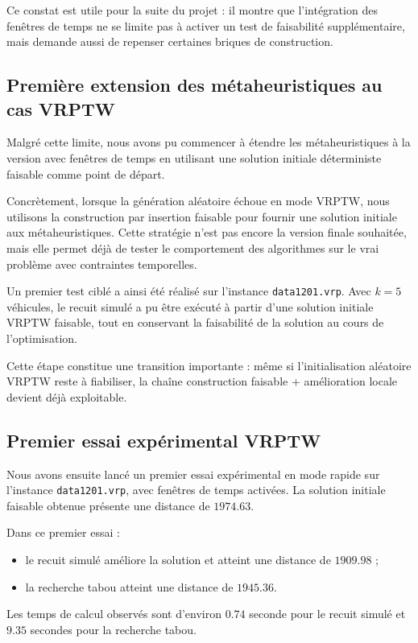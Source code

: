\documentclass[11pt,a4paper]{article}
\newcommand{\og}{%
  \ifmmode\langle\else\guillemotleft\nobreak\fi}
\newcommand{\fg}{%
  \ifmmode\rangle\else\nobreak\guillemotright\fi}
\begin{document}
Ce constat est utile pour la suite du projet : il montre que l'intégration des fenêtres de temps ne se limite pas à activer un test de faisabilité supplémentaire, mais demande aussi de repenser certaines briques de construction.

\subsection{Première extension des métaheuristiques au cas VRPTW}
Malgré cette limite, nous avons pu commencer à étendre les métaheuristiques à la version avec fenêtres de temps en utilisant une solution initiale déterministe faisable comme point de départ.

Concrètement, lorsque la génération aléatoire échoue en mode VRPTW, nous utilisons la construction par insertion faisable pour fournir une solution initiale aux métaheuristiques. Cette stratégie n'est pas encore la version finale souhaitée, mais elle permet déjà de tester le comportement des algorithmes sur le vrai problème avec contraintes temporelles.

Un premier test ciblé a ainsi été réalisé sur l'instance \texttt{data1201.vrp}. Avec \(k=5\) véhicules, le recuit simulé a pu être exécuté à partir d'une solution initiale VRPTW faisable, tout en conservant la faisabilité de la solution au cours de l'optimisation.

Cette étape constitue une transition importante : même si l'initialisation aléatoire VRPTW reste à fiabiliser, la chaîne \og construction faisable + amélioration locale \fg{} devient déjà exploitable.

\subsection{Premier essai expérimental VRPTW}
Nous avons ensuite lancé un premier essai expérimental en mode rapide sur l'instance \texttt{data1201.vrp}, avec fenêtres de temps activées. La solution initiale faisable obtenue présente une distance de \(1974.63\).

Dans ce premier essai :
\begin{itemize}
    \item le recuit simulé améliore la solution et atteint une distance de \(1909.98\) ;
    \item la recherche tabou atteint une distance de \(1945.36\).
\end{itemize}

Les temps de calcul observés sont d'environ \(0.74\) seconde pour le recuit simulé et \(9.35\) secondes pour la recherche tabou.
\end{document}
